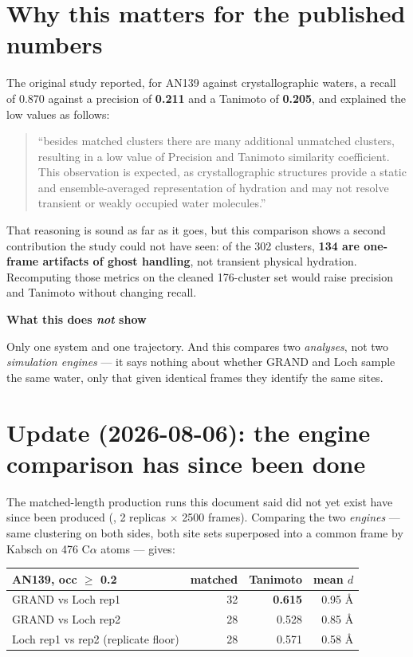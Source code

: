 \documentclass[11pt]{article}
\newcommand{\file}[1]{\texttt{\detokenize{#1}}}
\newenvironment{caveat}[1]{%
  \begin{lrbox}{\gpbox}\begin{minipage}{0.94\linewidth}%
  \textbf{\textcolor{red!55!black}{#1}}\par\smallskip\small}%
 {\end{minipage}\end{lrbox}%
  \begin{center}\setlength{\fboxrule}{0.7pt}%
  \fcolorbox{red!55!black}{red!4}{\usebox{\gpbox}}\end{center}}
\begin{document}
\section{Why this matters for the published numbers}

The original study reported, for AN139 against crystallographic waters, a recall of 0.870
against a precision of \textbf{0.211} and a Tanimoto of \textbf{0.205}, and explained the low
values as follows:

\begin{quote}\small
``besides matched clusters there are many additional unmatched clusters, resulting in a low
value of Precision and Tanimoto similarity coefficient. This observation is expected, as
crystallographic structures provide a static and ensemble-averaged representation of
hydration and may not resolve transient or weakly occupied water molecules.''
\end{quote}

That reasoning is sound as far as it goes, but this comparison shows a second contribution
the study could not have seen: of the 302 clusters, \textbf{134 are one-frame artifacts of
ghost handling}, not transient physical hydration. Recomputing those metrics on the cleaned
176-cluster set would raise precision and Tanimoto without changing recall.

\begin{caveat}{What this does \emph{not} show}
Only one system and one trajectory. And this compares two \emph{analyses}, not two
\emph{simulation engines} --- it says nothing about whether GRAND and Loch sample the same
water, only that given identical frames they identify the same sites.
\end{caveat}

\section*{Update (2026-08-06): the engine comparison has since been done}

The matched-length production runs this document said did not yet exist have since been
produced (\file{an139\_loch\_full/}, 2 replicas $\times$ 2500 frames). Comparing the two
\emph{engines} --- same clustering on both sides, both site sets superposed into a common
frame by Kabsch on 476 C$\alpha$ atoms --- gives:

\begin{center}\small
\begin{tabular}{@{}lrrr@{}}
\toprule
AN139, occ $\ge$ 0.2 & matched & Tanimoto & mean $d$ \\
\midrule
GRAND vs Loch rep1 & 32 & \textbf{0.615} & 0.95 \AA{} \\
GRAND vs Loch rep2 & 28 & 0.528 & 0.85 \AA{} \\
Loch rep1 vs rep2 (replicate floor) & 28 & 0.571 & 0.58 \AA{} \\
\bottomrule
\end{tabular}
\end{center}
\end{document}
